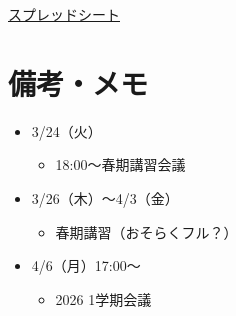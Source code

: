 \documentclass[a4paper,12pt]{ltjsarticle}
\begin{document}
\href{https://docs.google.com/spreadsheets/d/1dDO7kWSdryg2LqhwD9CDA9IB07sLHoLSbqeOP97zBPw/edit?usp=sharing}{スプレッドシート}

\section*{備考・メモ}
\begin{itemize}
  \item 3/24（火）
  \begin{itemize}
    \item 18:00〜春期講習会議
  \end{itemize}
  \item 3/26（木）〜4/3（金）
  \begin{itemize}
    \item 春期講習（おそらくフル？）
  \end{itemize}
  \item 4/6（月）17:00〜
  \begin{itemize}
    \item 2026 1学期会議
  \end{itemize}
\end{itemize}
\end{document}
